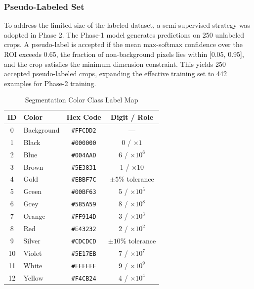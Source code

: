 \documentclass[conference]{IEEEtran}
\begin{document}
\subsubsection{Pseudo-Labeled Set} 
To address the limited size of the labeled dataset, a semi-supervised strategy was adopted in Phase 2. The Phase-1 model generates predictions on 250 unlabeled crops. A pseudo-label is accepted if the mean max-softmax confidence over the ROI exceeds 0.65, the fraction of non-background pixels lies within [0.05, 0.95],
and the crop satisfies the minimum dimension constraint. This yields 250 accepted pseudo-labeled crops, expanding the effective training set to 442 examples for Phase-2 training.

\begin{table}[!t]
  \caption{Segmentation Color Class Label Map}
  \label{tab:colormap}
  \centering
  \renewcommand{\arraystretch}{1.15}
  \begin{tabular}{@{}clcc@{}}
    \toprule
    \textbf{ID} & \textbf{Color} & \textbf{Hex Code} & \textbf{Digit / Role} \\
    \midrule
    0  & Background & \texttt{\#FFCDD2} & --- \\
    1  & Black      & \texttt{\#000000} & 0 / $\times 1$ \\
    2  & Blue       & \texttt{\#004AAD} & 6 / $\times 10^{6}$ \\
    3  & Brown      & \texttt{\#5E3831} & 1 / $\times 10$ \\
    4  & Gold       & \texttt{\#EBBF7C} & $\pm 5\%$ tolerance \\
    5  & Green      & \texttt{\#00BF63} & 5 / $\times 10^{5}$ \\
    6  & Grey       & \texttt{\#585A59} & 8 / $\times 10^{8}$ \\
    7  & Orange     & \texttt{\#FF914D} & 3 / $\times 10^{3}$ \\
    8  & Red        & \texttt{\#E43232} & 2 / $\times 10^{2}$ \\
    9  & Silver     & \texttt{\#CDCDCD} & $\pm 10\%$ tolerance \\
    10 & Violet     & \texttt{\#5E17EB} & 7 / $\times 10^{7}$ \\
    11 & White      & \texttt{\#FFFFFF} & 9 / $\times 10^{9}$ \\
    12 & Yellow     & \texttt{\#F4CB24} & 4 / $\times 10^{4}$ \\
    \bottomrule
  \end{tabular}
\end{table}
\end{document}
